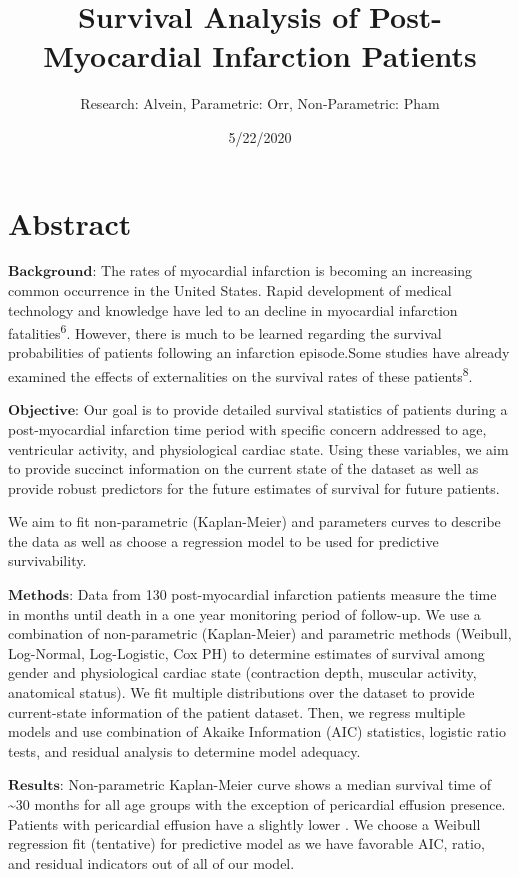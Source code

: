 \documentclass[
]{article}
\title{Survival Analysis of Post-Myocardial Infarction Patients}
\author{Research: Alvein, Parametric: Orr, Non-Parametric: Pham}
\date{5/22/2020}
\begin{document}
\maketitle

\hypertarget{abstract}{%
\section{Abstract}\label{abstract}}

\(\textbf{Background:}\) The rates of myocardial infarction is becoming
an increasing common occurrence in the United States. Rapid development
of medical technology and knowledge have led to an decline in myocardial
infarction fatalities\textsuperscript{6}. However, there is much to be
learned regarding the survival probabilities of patients following an
infarction episode.Some studies have already examined the effects of
externalities on the survival rates of these
patients\textsuperscript{8}.

\(\textbf{Objective:}\) Our goal is to provide detailed survival
statistics of patients during a post-myocardial infarction time period
with specific concern addressed to age, ventricular activity, and
physiological cardiac state. Using these variables, we aim to provide
succinct information on the current state of the dataset as well as
provide robust predictors for the future estimates of survival for
future patients.

We aim to fit non-parametric (Kaplan-Meier) and parameters curves to
describe the data as well as choose a regression model to be used for
predictive survivability.

\(\textbf{Methods:}\) Data from 130 post-myocardial infarction patients
measure the time in months until death in a one year monitoring period
of follow-up. We use a combination of non-parametric (Kaplan-Meier) and
parametric methods (Weibull, Log-Normal, Log-Logistic, Cox PH) to
determine estimates of survival among gender and physiological cardiac
state (contraction depth, muscular activity, anatomical status). We fit
multiple distributions over the dataset to provide current-state
information of the patient dataset. Then, we regress multiple models and
use combination of Akaike Information (AIC) statistics, logistic ratio
tests, and residual analysis to determine model adequacy.

\(\textbf{Results:}\) Non-parametric Kaplan-Meier curve shows a median
survival time of \textasciitilde30 months for all age groups with the
exception of pericardial effusion presence. Patients with pericardial
effusion have a slightly lower . We choose a Weibull regression fit
(tentative) for predictive model as we have favorable AIC, ratio, and
residual indicators out of all of our model.
\end{document}
